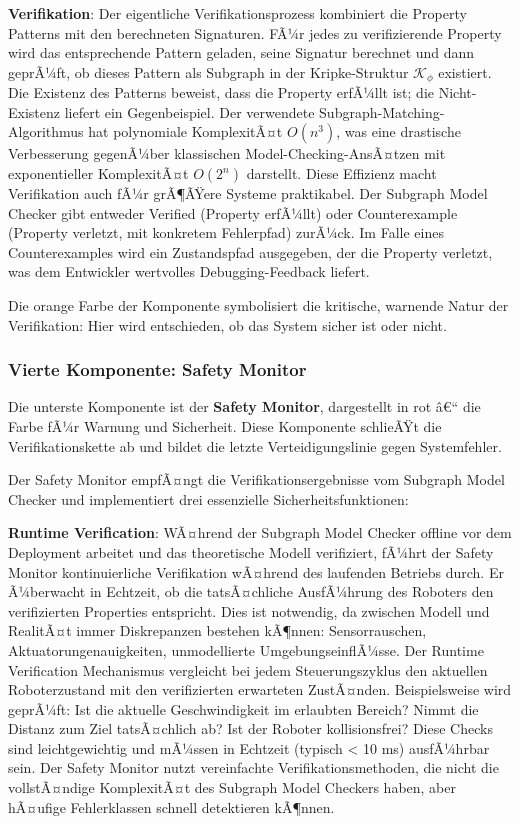﻿\documentclass[a4paper,12pt]{article}
\theoremstyle{definition}
\begin{document}
\textbf{Verifikation}: Der eigentliche Verifikationsprozess kombiniert die Property Patterns mit den berechneten Signaturen. FÃ¼r jedes zu verifizierende Property wird das entsprechende Pattern geladen, seine Signatur berechnet und dann geprÃ¼ft, ob dieses Pattern als Subgraph in der Kripke-Struktur $\mathcal{K}_\phi$ existiert. Die Existenz des Patterns beweist, dass die Property erfÃ¼llt ist; die Nicht-Existenz liefert ein Gegenbeispiel. Der verwendete Subgraph-Matching-Algorithmus hat polynomiale KomplexitÃ¤t $O(n^3)$, was eine drastische Verbesserung gegenÃ¼ber klassischen Model-Checking-AnsÃ¤tzen mit exponentieller KomplexitÃ¤t $O(2^n)$ darstellt. Diese Effizienz macht Verifikation auch fÃ¼r grÃ¶ÃŸere Systeme praktikabel. Der Subgraph Model Checker gibt entweder Verified (Property erfÃ¼llt) oder Counterexample (Property verletzt, mit konkretem Fehlerpfad) zurÃ¼ck. Im Falle eines Counterexamples wird ein Zustandspfad ausgegeben, der die Property verletzt, was dem Entwickler wertvolles Debugging-Feedback liefert.

Die orange Farbe der Komponente symbolisiert die kritische, warnende Natur der Verifikation: Hier wird entschieden, ob das System sicher ist oder nicht.

\subsubsection{Vierte Komponente: Safety Monitor}

Die unterste Komponente ist der \textbf{Safety Monitor}, dargestellt in rot â€“ die Farbe fÃ¼r Warnung und Sicherheit. Diese Komponente schlieÃŸt die Verifikationskette ab und bildet die letzte Verteidigungslinie gegen Systemfehler.

Der Safety Monitor empfÃ¤ngt die Verifikationsergebnisse vom Subgraph Model Checker und implementiert drei essenzielle Sicherheitsfunktionen:

\textbf{Runtime Verification}: WÃ¤hrend der Subgraph Model Checker offline vor dem Deployment arbeitet und das theoretische Modell verifiziert, fÃ¼hrt der Safety Monitor kontinuierliche Verifikation wÃ¤hrend des laufenden Betriebs durch. Er Ã¼berwacht in Echtzeit, ob die tatsÃ¤chliche AusfÃ¼hrung des Roboters den verifizierten Properties entspricht. Dies ist notwendig, da zwischen Modell und RealitÃ¤t immer Diskrepanzen bestehen kÃ¶nnen: Sensorrauschen, Aktuatorungenauigkeiten, unmodellierte UmgebungseinflÃ¼sse. Der Runtime Verification Mechanismus vergleicht bei jedem Steuerungszyklus den aktuellen Roboterzustand mit den verifizierten erwarteten ZustÃ¤nden. Beispielsweise wird geprÃ¼ft: Ist die aktuelle Geschwindigkeit im erlaubten Bereich? Nimmt die Distanz zum Ziel tatsÃ¤chlich ab? Ist der Roboter kollisionsfrei? Diese Checks sind leichtgewichtig und mÃ¼ssen in Echtzeit (typisch < 10 ms) ausfÃ¼hrbar sein. Der Safety Monitor nutzt vereinfachte Verifikationsmethoden, die nicht die vollstÃ¤ndige KomplexitÃ¤t des Subgraph Model Checkers haben, aber hÃ¤ufige Fehlerklassen schnell detektieren kÃ¶nnen.
\end{document}

